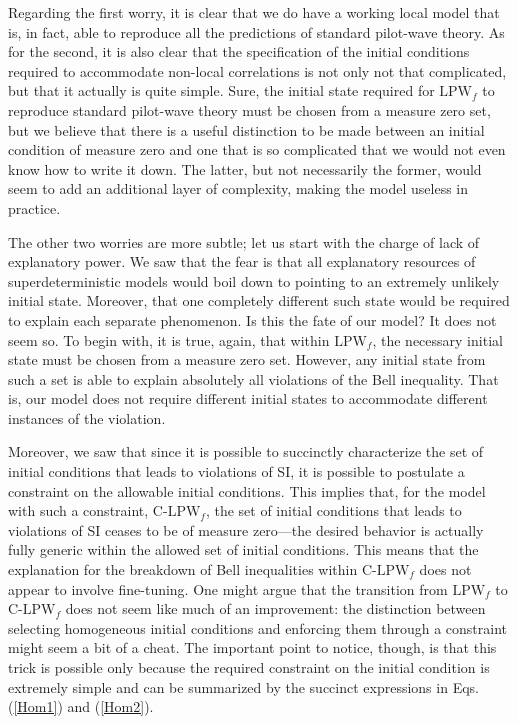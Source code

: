 \documentclass[letterpaper,12pt]{article}
\begin{document}
Regarding the first worry, it is clear that we do have a working local model that is, in fact, able to reproduce all the predictions of standard pilot-wave theory. As for the second, it is also clear that the specification of the initial conditions required to accommodate non-local correlations is not only not that complicated, but that it actually is quite simple. Sure, the initial state required for $\text{LPW}_f$ to reproduce standard pilot-wave theory must be chosen from a measure zero set, but we believe that there is a useful distinction to be made between an initial condition of measure zero and one that is so complicated that we would not even know how to write it down. The latter, but not necessarily the former, would seem to add an additional layer of complexity, making the model useless in practice.

The other two worries are more subtle; let us start with the charge of lack of explanatory power. We saw that the fear is that all explanatory resources of superdeterministic models would boil down to pointing to an extremely unlikely initial state. Moreover, that one completely different such state would be required to explain each separate phenomenon. Is this the fate of our model? It does not seem so. To begin with, it is true, again, that within $\text{LPW}_f$, the necessary initial state must be chosen from a measure zero set. However, any initial state from such a set is able to explain absolutely all violations of the Bell inequality. That is, our model does not require different initial states to accommodate different instances of the violation.

Moreover, we saw that since it is possible to succinctly characterize the set of initial conditions that leads to violations of SI, it is possible to postulate a constraint on the allowable initial conditions. This implies that, for the model with such a constraint, $\text{C-LPW}_f$, the set of initial conditions that leads to violations of SI ceases to be of measure zero---the desired behavior is actually fully generic within the allowed set of initial conditions. This means that the explanation for the breakdown of Bell inequalities within $\text{C-LPW}_f$ does not appear to involve fine-tuning. One might argue that the transition from $\text{LPW}_f$ to $\text{C-LPW}_f$ does not seem like much of an improvement: the distinction between selecting homogeneous initial conditions and enforcing them through a constraint might seem a bit of a cheat. The important point to notice, though, is that this trick is possible only because the required constraint on the initial condition is extremely simple and can be summarized by the succinct expressions in Eqs. (\ref{Hom1}) and (\ref{Hom2}). 
\end{document}
